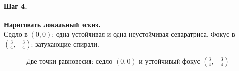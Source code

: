 \paragraph{Шаг 4.} \textbf{Нарисовать локальный эскиз.}\\
Седло в \((0,0)\): одна устойчивая и одна неустойчивая сепаратриса.
Фокус в \((\tfrac{3}{4},-\tfrac{3}{4})\): затухающие спирали.

\[
\boxed{\,\text{Две точки равновесия: седло }(0,0)\text{ и устойчивый фокус }(\tfrac{3}{4},-\tfrac{3}{4})\,}
\]
